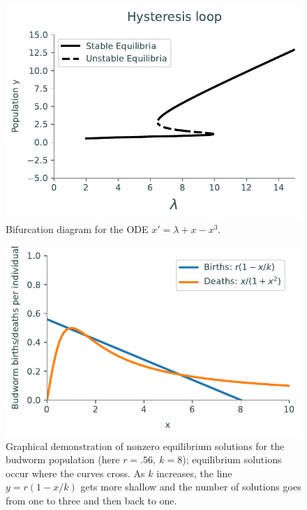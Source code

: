 \begin{figure}
\centering
\includegraphics[width=\textwidth]{figures/HysteresisBifurcation.pdf}
\caption{Bifurcation diagram for the ODE $x' = \lambda + x - x^3$. }
\label{bifurcation:hysteresis}
\end{figure}

\begin{figure}
\centering
\includegraphics[width=\textwidth]{figures/BudwormEquilibria.pdf}
\caption{Graphical demonstration of nonzero equilibrium solutions for the budworm population (here $r = .56,\ k=8$); equilibrium solutions occur where the curves cross.
As $k$ increases, the line $y=r(1- x/k)$ gets more shallow and the number of solutions goes from one to three and then back to one. }
\label{equilibria:budworm}
\end{figure}

